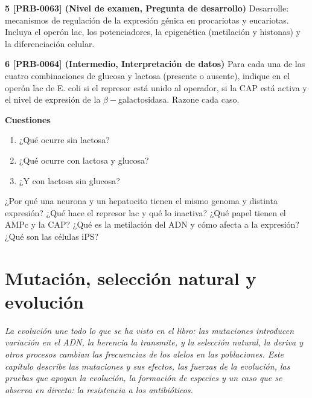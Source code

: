 \documentclass{book}
\begin{document}
\begin{tcolorbox}[title={Ejercicios}, studiumworked, breakable]
\noindent\textbf{5 [PRB-0063] (Nivel de examen, Pregunta de desarrollo)}
Desarrolle: mecanismos de regulación de la expresión génica en procariotas y eucariotas. Incluya el operón lac, los potenciadores, la epigenética (metilación y histonas) y la diferenciación celular.


\noindent\textbf{6 [PRB-0064] (Intermedio, Interpretación de datos)}
Para cada una de las cuatro combinaciones de glucosa y lactosa (presente o ausente), indique en el operón lac de E. coli si el represor está unido al operador, si la CAP está activa y el nivel de expresión de la \(\beta-\)galactosidasa. Razone cada caso.


\noindent\textbf{Cuestiones}
\begin{enumerate}
\item ¿Qué ocurre sin lactosa?
\item ¿Qué ocurre con lactosa y glucosa?
\item ¿Y con lactosa sin glucosa?
\end{enumerate}
\end{tcolorbox}

\begin{tcolorbox}[title={Autoficha}, studiumcheck, breakable]

¿Por qué una neurona y un hepatocito tienen el mismo genoma y distinta expresión? ¿Qué hace el represor lac y qué lo inactiva? ¿Qué papel tienen el AMPc y la CAP? ¿Qué es la metilación del ADN y cómo afecta a la expresión? ¿Qué son las células iPS?

\end{tcolorbox}

\chapter{Mutación, selección natural y evolución}
\label{chap:bio-09}

\noindent\textit{La evolución une todo lo que se ha visto en el libro: las mutaciones introducen variación en el ADN, la herencia la transmite, y la selección natural, la deriva y otros procesos cambian las frecuencias de los alelos en las poblaciones. Este capítulo describe las mutaciones y sus efectos, las fuerzas de la evolución, las pruebas que apoyan la evolución, la formación de especies y un caso que se observa en directo: la resistencia a los antibióticos.}
\end{document}
